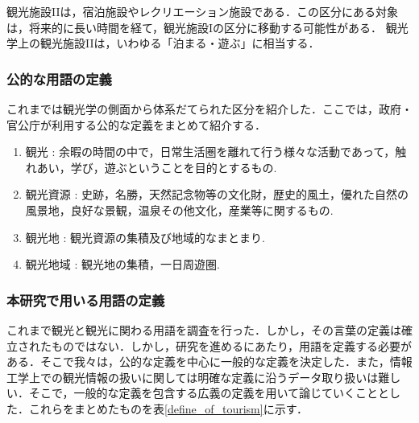 \documentclass{jsarticle}
\begin{document}
観光施設IIは，宿泊施設やレクリエーション施設である．この区分にある対象は，将来的に長い時間を経て，観光施設Iの区分に移動する可能性がある．
観光学上の観光施設IIは，いわゆる「泊まる・遊ぶ」に相当する．


\subsubsection{公的な用語の定義}

これまでは観光学の側面から体系だてられた区分を紹介した．ここでは，政府・官公庁が利用する公的な定義をまとめて紹介する．

\begin{enumerate}
\item 観光      : 余暇の時間の中で，日常生活圏を離れて行う様々な活動であって，触れあい，学び，遊ぶということを目的とするもの\cite{toshin_1995}.
\item 観光資源  : 史跡，名勝，天然記念物等の文化財，歴史的風土，優れた自然の風景地，良好な景観，温泉その他文化，産業等に関するもの\cite{tourism_law_2007}.
\item 観光地    : 観光資源の集積及び地域的なまとまり\cite{tourism_kensetsu_1974}.
\item 観光地域  : 観光地の集積，一日周遊圏\cite{tourism_kensetsu_1974}.
\end{enumerate}

\subsubsection{本研究で用いる用語の定義}

これまで観光と観光に関わる用語を調査を行った．しかし，その言葉の定義は確立されたものではない．しかし，研究を進めるにあたり，用語を定義する必要がある．そこで我々は，公的な定義を中心に一般的な定義を決定した．また，情報工学上での観光情報の扱いに関しては明確な定義に沿うデータ取り扱いは難しい．そこで，一般的な定義を包含する広義の定義を用いて論じていくこととした．これらをまとめたものを表\ref{define_of_tourism}に示す．
\end{document}
